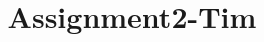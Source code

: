 \documentclass{article}  %
\title{\LARGE \bf
	Assignment2-Tim
}
\begin{document}
\maketitle

\cite{1389727}
\cite{4543489}
\cite{5459469}
\cite{5509725}
\cite{990517}



\end{document}
